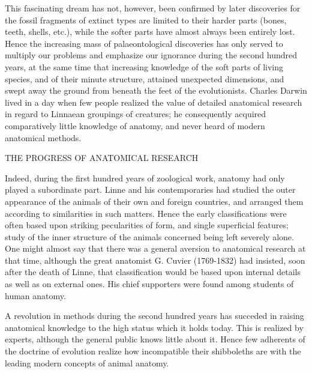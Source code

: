 This fascinating dream has not, however, been confirmed by later discoveries for the fossil
fragments of extinct types are limited to their harder parts (bones, teeth, shells, etc.), while
the softer parts have almost always been entirely lost. Hence the increasing mass of
palaeontological discoveries has only served to multiply our problems and emphasize our
ignorance during the second hundred years, at the same time that increasing knowledge of
the soft parts of living species, and of their minute structure, attained unexpected dimensions,
and swept away the ground from beneath the feet of the evolutionists. Charles Darwin lived
in a day when few people realized the value of detailed anatomical research in regard to
Linnaean groupings of creatures; he consequently acquired comparatively little knowledge of
anatomy, and never heard of modern anatomical methods.

THE PROGRESS OF ANATOMICAL RESEARCH

Indeed, during the first hundred years of zoological work, anatomy had only played a
subordinate part. Linne and his contemporaries had studied the outer appearance of the
animals of their own and foreign countries, and arranged them according to similarities in
such matters. Hence the early classifications were often based upon striking pecularities of
form, and single superficial features; study of the inner structure of the animals concerned
being left severely alone. One might almost say that there was a general aversion to
anatomical research at that time, although the great anatomist G. Cuvier (1769-1832) had
insisted, soon after the death of Linne, that classification would be based upon internal details
as well as on external ones. His chief supporters were found among students of human
anatomy.

A revolution in methods during the second hundred years has succeded in raising anatomical
knowledge to the high status which it holds today. This is realized by experts, although the
general public knows little about it. Hence few adherents of the doctrine of evolution realize
how incompatible their shibboleths are with the leading modern concepts of animal anatomy.

